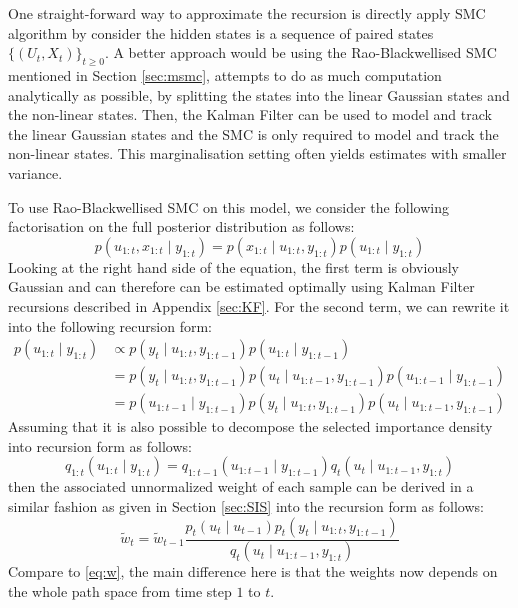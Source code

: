 One straight-forward way to approximate the recursion is directly apply SMC algorithm by consider the hidden states is a sequence of paired states $\{(U_t, X_t)\}_{t \geq 0}$. A better approach would be using the Rao-Blackwellised SMC mentioned in Section \ref{sec:msmc}, attempts to do as much computation analytically as possible, by splitting the states into the linear Gaussian states and the non-linear states. Then, the Kalman Filter can be used to model and track the linear Gaussian states and the SMC is only required to model and track the non-linear states. This marginalisation setting often yields estimates with smaller variance.

To use Rao-Blackwellised SMC on this model, we consider the following factorisation on the full posterior distribution as follows:
\begin{equation}
  p(u_{1:t}, x_{1:t} \mid y_{1:t}) = p(x_{1:t} \mid u_{1:t}, y_{1:t}) p(u_{1:t} \mid y_{1:t})
\end{equation}
Looking at the right hand side of the equation, the first term is obviously Gaussian and can therefore can be estimated optimally using Kalman Filter recursions described in Appendix \ref{sec:KF}. For the second term, we can rewrite it into the following recursion form:
\begin{align}
p(u_{1:t} \mid y_{1:t}) &\propto p(y_t \mid u_{1:t}, y_{1:t-1}) p(u_{1:t} \mid y_{1:t-1}) \nonumber \\
&=  p(y_t \mid u_{1:t}, y_{1:t-1}) p(u_t \mid u_{1:t-1}, y_{1:t-1}) p(u_{1:t-1} \mid y_{1:t-1}) \nonumber \\
&=  p(u_{1:t-1} \mid y_{1:t-1}) p(y_t \mid u_{1:t}, y_{1:t-1}) p(u_t \mid u_{1:t-1}, y_{1:t-1})
\label{eq:msmc}
\end{align}
Assuming that it is also possible to decompose the selected importance density into recursion form as follows:
\begin{equation}
        q_{1:t}(u_{1:t} \mid y_{1:t}) = q_{1:t-1}(u_{1:t-1} \mid y_{1:t-1}) q_t(u_t \mid u_{1:t-1}, y_{1:t})
\label{eq:q2}
\end{equation}
then the associated unnormalized weight of each sample can be derived in a similar fashion as given in Section \ref{sec:SIS} into the recursion form as follows:
\begin{equation}
   \tilde{w}_t  = \tilde{w}_{t-1} \dfrac{p_t(u_t \mid u_{t-1})p_t(y_t \mid u_{1:t}, y_{1:t-1})}{q_t(u_t \mid u_{1:t-1}, y_{1:t})}
   \label{eq:wsmsc}
\end{equation}
Compare to \eqref{eq:w}, the main difference here is that the weights now depends on the whole path space from time step $1$ to $t$.

